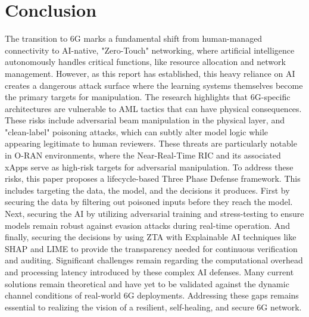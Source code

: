 \documentclass[letterpaper]{article} %
\begin{document}
\section{Conclusion}
The transition to 6G marks a fundamental shift from human-managed connectivity to AI-native, "Zero-Touch" networking, where artificial intelligence autonomously handles critical functions, like resource allocation and network management\cite{Suomalainen_2025}. However, as this report has established, this heavy reliance on AI creates a dangerous attack surface where the learning systems themselves become the primary targets for manipulation\cite{Kumar_Dutta_Vamsi_Sankararao_Varri_Puthal_2026}. 
The research highlights that 6G-specific architectures are vulnerable to AML tactics that can have physical consequences. These risks include adversarial beam manipulation in the physical layer, and "clean-label" poisoning attacks, which can subtly alter model logic while appearing legitimate to human reviewers. These threats are particularly notable in O-RAN environments, where the Near-Real-Time RIC and its associated xApps serve as high-risk targets for adversarial manipulation\cite{Catak_Catak_Moldsvor_2021}.
To address these risks, this paper proposes a lifecycle-based Three Phase Defense framework. This includes targeting the data, the model, and the decisions it produces. First by securing the data by filtering out poisoned inputs before they reach the model. Next, securing the AI by utilizing adversarial training and stress-testing to ensure models remain robust against evasion attacks during real-time operation. And finally, securing the decisions by using ZTA with Explainable AI techniques like SHAP and LIME to provide the transparency needed for continuous verification and auditing\cite{Kumar_Dutta_Vamsi_Sankararao_Varri_Puthal_2026}.
Significant challenges remain regarding the computational overhead and processing latency introduced by these complex AI defenses\cite{Chen_Zhang_Zhang_Wang_Liu_2021}. Many current solutions remain theoretical and have yet to be validated against the dynamic channel conditions of real-world 6G deployments. Addressing these gaps remains essential to realizing the vision of a resilient, self-healing, and secure 6G network.



\end{document}
